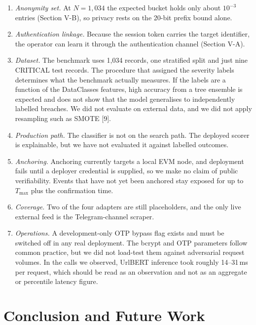 \documentclass[10pt,twocolumn]{article}
\begin{document}
\begin{enumerate}[label=\Alph*.,leftmargin=1.6em,itemsep=2pt]
\item \textit{Anonymity set.} At $N=1{,}034$ the expected bucket holds only about $10^{-3}$ entries (Section V-B), so privacy rests on the 20-bit prefix bound alone.
\item \textit{Authentication linkage.} Because the session token carries the target identifier, the operator can learn it through the authentication channel (Section V-A).
\item \textit{Dataset.} The benchmark uses 1,034 records, one stratified split and just nine CRITICAL test records. The procedure that assigned the severity labels determines what the benchmark actually measures. If the labels are a function of the DataClasses features, high accuracy from a tree ensemble is expected and does not show that the model generalises to independently labelled breaches. We did not evaluate on external data, and we did not apply resampling such as SMOTE [9].
\item \textit{Production path.} The classifier is not on the search path. The deployed scorer is explainable, but we have not evaluated it against labelled outcomes.
\item \textit{Anchoring.} Anchoring currently targets a local EVM node, and deployment fails until a deployer credential is supplied, so we make no claim of public verifiability. Events that have not yet been anchored stay exposed for up to $T_{\max}$ plus the confirmation time.
\item \textit{Coverage.} Two of the four adapters are still placeholders, and the only live external feed is the Telegram-channel scraper.
\item \textit{Operations.} A development-only OTP bypass flag exists and must be switched off in any real deployment. The bcrypt and OTP parameters follow common practice, but we did not load-test them against adversarial request volumes. In the calls we observed, UrlBERT inference took roughly 14--31\,ms per request, which should be read as an observation and not as an aggregate or percentile latency figure.
\end{enumerate}

\section{Conclusion and Future Work}
\end{document}
